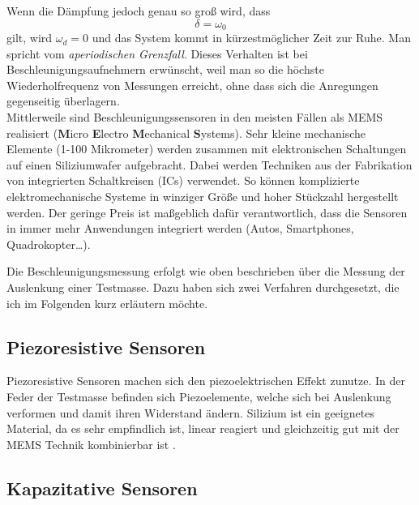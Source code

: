\documentclass[12pt,a4paper,twoside,BCOR=12.5mm]{scrartcl}
\begin{document}
Wenn die Dämpfung jedoch genau so groß wird, dass
\begin{equation}
\delta = \omega_0
\end{equation}
gilt, wird $\omega_d = 0$ und das System kommt in kürzestmöglicher Zeit zur Ruhe. Man spricht vom \textit{aperiodischen Grenzfall}. Dieses Verhalten ist bei Beschleunigungsaufnehmern erwünscht, weil man so die höchste Wiederholfrequenz von Messungen erreicht, ohne dass sich die Anregungen gegenseitig überlagern.\\




Mittlerweile sind Beschleunigungssensoren in den meisten Fällen als MEMS realisiert (\textbf{M}icro \textbf{E}lectro \textbf{M}echanical \textbf{S}ystems). Sehr kleine mechanische Elemente (1-100 Mikrometer) werden zusammen mit elektronischen Schaltungen auf einen Siliziumwafer aufgebracht. Dabei werden Techniken aus der Fabrikation von integrierten Schaltkreisen (ICs) verwendet. So können komplizierte elektromechanische Systeme in winziger Größe und hoher Stückzahl hergestellt werden. Der geringe Preis ist maßgeblich dafür verantwortlich, dass die Sensoren in immer mehr Anwendungen integriert werden (Autos, Smartphones, Quadrokopter…).

Die Beschleunigungsmessung erfolgt wie oben beschrieben über die Messung der Auslenkung einer Testmasse. Dazu haben sich zwei Verfahren durchgesetzt, die ich im Folgenden kurz erläutern möchte. 

\subsection{Piezoresistive Sensoren}
Piezoresistive Sensoren machen sich den piezoelektrischen Effekt zunutze. In der Feder der Testmasse befinden sich Piezoelemente, welche sich bei Auslenkung verformen und damit ihren Widerstand ändern. Silizium ist ein geeignetes Material, da es sehr empfindlich ist, linear reagiert und gleichzeitig gut mit der MEMS Technik kombinierbar ist \citep{Kanda:1991gf}.

\subsection{Kapazitative Sensoren}
\end{document}
